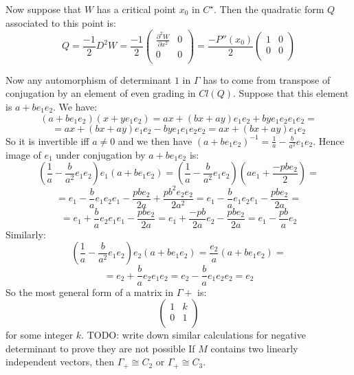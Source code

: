 \documentclass[a4paper]{article}
\begin{document}
	Now suppose that $W$ has a critical point $x_0$ in $C^{\star}$. Then the quadratic form $Q$ associated to this point is:
	$$Q= \frac{-1}{2} D^2 W = \frac{-1}{2}\begin{pmatrix}
	\frac{\partial^2 W}{\partial x^2} & 0 \\ 
	0 &  0\\
	\end{pmatrix} = \frac{- P''(x_0)}{2} \begin{pmatrix}
	1 & 0 \\ 
	0 &  0\\
	\end{pmatrix}$$
	
	Now any automorphism of determinant $1$ in $\Gamma$ has to come from transpose of conjugation by an element of even grading in $Cl(Q)$. Suppose that this element is $a+ b e_1e_2$. We have:
	$$(a+b e_1 e_2)(x+y e_1 e_2) = a x + (b x + a y) e_1 e_2 + b y e_1 e_2 e_1 e_2 =$$
	$$  =  a x + (b x + a y) e_1 e_2 - b y e_1 e_1 e_2 e_2 = a x+(b x +a y) e_1 e_2$$
	So it is invertible iff $a \neq 0$ and we then have $(a+ b e_1 e_2)^{-1} = \frac{1}{a} - \frac{b}{a^2} e_1 e_2$.
	Hence image of $e_1$ under conjugation by $a+ b e_1 e_2$ is:
	$$ (\frac{1}{a} - \frac{b}{a^2} e_1 e_2) e_1 (a+ b e_1 e_2) = (\frac{1}{a} - \frac{b}{a^2} e_1 e_2) (a e_1 + \frac{- p b e_2}{2}) =$$ $$= e_1 - \frac{b}{a} e_1 e_2 e_1 - \frac{p b e_2}{2 a} + \frac{p b^2 e_2 e_2}{2 a^2} = e_1 - \frac{b}{a} e_1 e_2 e_1 - \frac{p b e_2}{2 a} =$$
	$$= e_1 + \frac{b}{a} e_2 e_1 e_1 - \frac{p b e_2}{2 a} = e_1 + \frac{ -p b}{2a} e_2 - \frac{p b e_2}{2 a} = e_1 - \frac{p b}{a} e_2$$
	Similarly:
	$$ (\frac{1}{a} - \frac{b}{a^2} e_1 e_2) e_2 (a+ b e_1 e_2) = \frac{e_2}{a} (a+ b e_1 e_2) =$$
	$$=e_2+\frac{b}{a}e_2 e_1 e_2 = e_2 - \frac{b}{a} e_1 e_2 e_2 = e_2$$
	So the most general form of a matrix in $\Gamma+$ is:
	$$\begin{pmatrix}
		1 & k \\ 
		0 &  1\\
		\end{pmatrix}$$ for some integer $k$. 
	TODO: write down similar calculations for negative determinant to prove they are not possible
    \clm If $M$ contains two linearly independent vectors, then $\Gamma_+ \cong C_2$ or $\Gamma_+ \cong C_3$.
    
\end{document}
